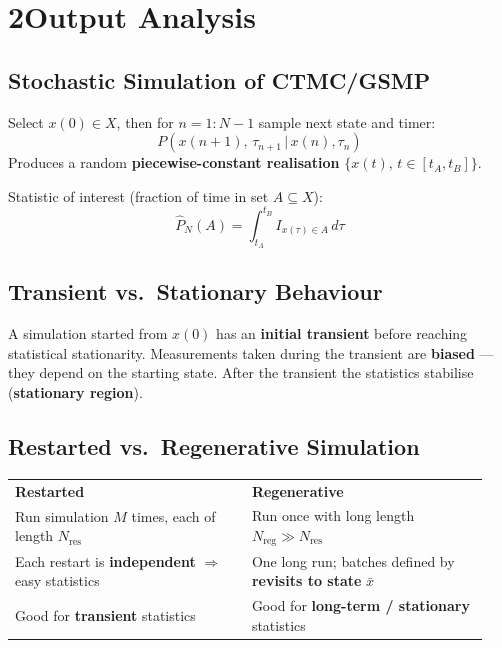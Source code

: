 \documentclass[10pt,a4paper]{article}
\begin{document}
\section*{2\quad Output Analysis}

\subsection*{Stochastic Simulation of CTMC/GSMP}

Select $x(0) \in X$, then for $n = 1:N-1$ sample next state and timer:
\[
  P\!\left(x(n{+}1),\,\tau_{n+1}\,\big|\,x(n),\tau_n\right)
\]
Produces a random \textbf{piecewise-constant realisation} $\{x(t),\, t \in [t_A, t_B]\}$.

Statistic of interest (fraction of time in set $A \subseteq X$):
\[
  \hat{P}_N(A) = \int_{t_A}^{t_B} I_{x(\tau)\in A}\,d\tau
\]

\subsection*{Transient vs.\ Stationary Behaviour}

\begin{notebox}
A simulation started from $x(0)$ has an \textbf{initial transient} before reaching statistical stationarity.
Measurements taken during the transient are \textbf{biased} --- they depend on the starting state.
After the transient the statistics stabilise (\textbf{stationary region}).
\end{notebox}

\subsection*{Restarted vs.\ Regenerative Simulation}

\begin{keybox}
\begin{tabular}{@{}p{0.47\linewidth}@{\quad}p{0.47\linewidth}@{}}
\textbf{Restarted} & \textbf{Regenerative} \\[1pt]
Run simulation $M$ times, each of length $N_{\text{res}}$ & Run once with long length $N_{\text{reg}} \gg N_{\text{res}}$ \\
Each restart is \textbf{independent} $\Rightarrow$ easy statistics & One long run; batches defined by \textbf{revisits to state} $\bar{x}$ \\
Good for \textbf{transient} statistics & Good for \textbf{long-term / stationary} statistics \\
\end{tabular}
\end{keybox}
\end{document}
